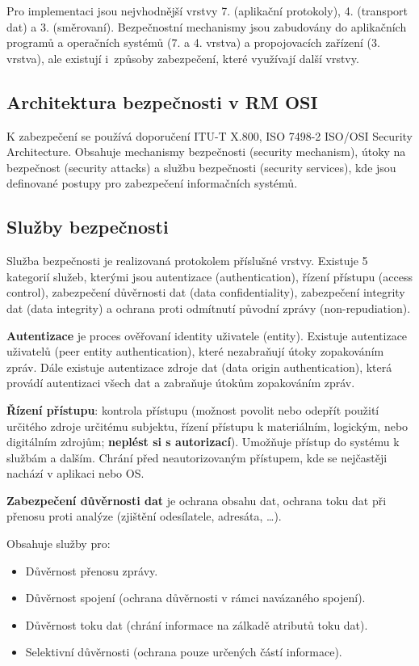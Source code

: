 Pro implementaci jsou nejvhodnější vrstvy 7. (aplikační protokoly), 4. (transport dat) a 3. (směrovaní).
Bezpečnostní mechanismy jsou zabudovány do aplikačních programů a operačních systémů (7. a 4. vrstva)  a propojovacích zařízení (3. vrstva), ale existují i~způsoby zabezpečení, které využívají další vrstvy.

\subsection{Architektura bezpečnosti v RM OSI}

K zabezpečení se používá doporučení ITU-T X.800, ISO 7498-2 ISO/OSI Security Architecture. Obsahuje mechanismy bezpečnosti (security mechanism), útoky na bezpečnost (security attacks) a službu bezpečnosti (security services), kde jsou definované postupy pro zabezpečení informačních systémů.

\subsection{Služby bezpečnosti}

Služba bezpečnosti je realizovaná protokolem příslušné vrstvy. Existuje 5 kategorií služeb, kterými jsou autentizace (authentication), řízení přístupu (access control), zabezpečení důvěrnosti dat (data confidentiality), zabezpečení integrity dat (data integrity) a ochrana proti odmítnutí původní zprávy (non-repudiation).

\textbf{Autentizace} je proces ověřovaní identity uživatele (entity). Existuje autentizace uživatelů (peer entity authentication), které nezabraňují útoky zopakováním zpráv. Dále existuje autentizace zdroje dat (data origin authentication), která provádí autentizaci všech dat a zabraňuje útokům zopakováním zpráv.

\textbf{Řízení přístupu}: kontrola přístupu (možnost povolit nebo odepřít použití určitého zdroje určitému subjektu, řízení přístupu k materiálním, logickým, nebo digitálním zdrojům; \textbf{neplést si s autorizací}).
Umožňuje přístup  do systému k službám a dalším.
Chrání před neautorizovaným přístupem, kde se nejčastěji nachází v aplikaci nebo OS.

\textbf{Zabezpečení důvěrnosti dat} je ochrana obsahu dat, ochrana toku dat při přenosu proti analýze (zjištění odesílatele, adresáta, \dots). 

\noindent Obsahuje služby pro:
\begin{itemize}[noitemsep]
    \item Důvěrnost přenosu zprávy.
    \item Důvěrnost spojení (ochrana důvěrnosti v rámci navázaného spojení).
    \item Důvěrnost toku dat (chrání informace na zálkadě atributů toku dat).
    \item Selektivní důvěrnosti (ochrana pouze určených částí informace).
\end{itemize}

